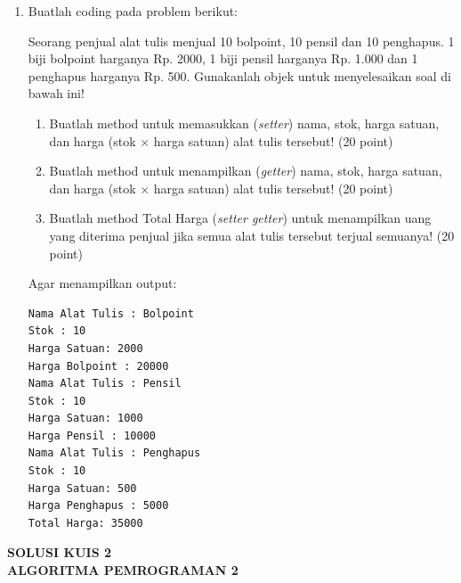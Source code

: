 \documentclass[12pt,a4paper]{article}
\begin{document}
\begin{enumerate}[label=\arabic*.]
\begin{verbatim}
    public void info() {
        System.out.println("Warna persegi adalah : " + Warna);
        System.out.println("Ukuran adalah : " + sisi);
    }
}
\end{verbatim}

        Agar menampilkan output berikut:

        \begin{verbatim}
Konstruktor Bentuk dipanggil
Konstruktor Persegi dipanggil
Warna persegi adalah : Merah
Ukuran adalah : 8
\end{verbatim}

  \item Buatlah coding pada problem berikut:

        Seorang penjual alat tulis menjual 10 bolpoint, 10 pensil dan 10 penghapus.
        1 biji bolpoint harganya Rp. 2000, 1 biji pensil harganya Rp. 1.000 dan
        1 penghapus harganya Rp. 500. Gunakanlah objek untuk menyelesaikan soal
        di bawah ini!

        \begin{enumerate}[label=\alph*.]
          \item Buatlah method untuk memasukkan (\textit{setter}) nama, stok, harga satuan,
                dan harga (stok $\times$ harga satuan) alat tulis tersebut! (20 point)
          \item Buatlah method untuk menampilkan (\textit{getter}) nama, stok, harga satuan,
                dan harga (stok $\times$ harga satuan) alat tulis tersebut! (20 point)
          \item Buatlah method Total Harga (\textit{setter getter}) untuk menampilkan uang yang
                diterima penjual jika semua alat tulis tersebut terjual semuanya! (20 point)
        \end{enumerate}

        Agar menampilkan output:

        \begin{verbatim}
Nama Alat Tulis : Bolpoint
Stok : 10
Harga Satuan: 2000
Harga Bolpoint : 20000
Nama Alat Tulis : Pensil
Stok : 10
Harga Satuan: 1000
Harga Pensil : 10000
Nama Alat Tulis : Penghapus
Stok : 10
Harga Satuan: 500
Harga Penghapus : 5000
Total Harga: 35000
\end{verbatim}
\end{enumerate}

\newpage

\begin{center}
  \textbf{SOLUSI KUIS 2}\\
  \textbf{ALGORITMA PEMROGRAMAN 2}
\end{center}
\end{document}
